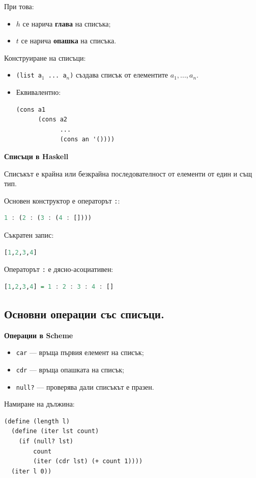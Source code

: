 \documentclass{article}
\renewcommand{\\}{\newline}
\begin{document}
При това:
\begin{itemize}
    \item \(h\) се нарича \textbf{глава} на списъка;
    \item \(t\) се нарича \textbf{опашка} на списъка.
\end{itemize}

Конструиране на списъци:
\begin{itemize}
    \item \texttt{(list a\(_1\) ... a\(_n\))} създава списък от елементите \(a_1, ..., a_n\).
    \item Еквивалентно:
\begin{lstlisting}
(cons a1
      (cons a2
            ...
            (cons an '())))
\end{lstlisting}
\end{itemize}

\textbf{Списъци в Haskell}

Списъкът е крайна или безкрайна последователност от елементи от един и същ тип.

Основен конструктор е операторът \texttt{:}:
\begin{lstlisting}[language=haskell]
1 : (2 : (3 : (4 : [])))
\end{lstlisting}

Съкратен запис:
\begin{lstlisting}[language=haskell]
[1,2,3,4]
\end{lstlisting}

Операторът \texttt{:} е дясно-асоциативен:
\begin{lstlisting}[language=haskell]
[1,2,3,4] = 1 : 2 : 3 : 4 : []
\end{lstlisting}

\subsection{Основни операции със списъци.}

\textbf{Операции в Scheme}

\begin{itemize}
    \item \texttt{car} --- връща първия елемент на списък;
    \item \texttt{cdr} --- връща опашката на списък;
    \item \texttt{null?} --- проверява дали списъкът е празен.
\end{itemize}

Намиране на дължина:
\begin{lstlisting}
(define (length l)
  (define (iter lst count)
    (if (null? lst)
        count
        (iter (cdr lst) (+ count 1))))
  (iter l 0))
\end{lstlisting}
\end{document}
